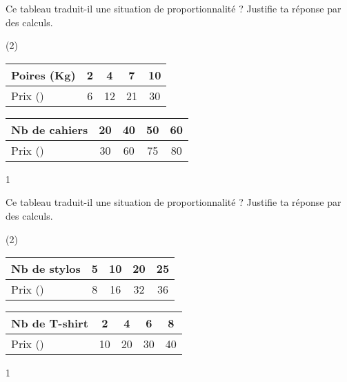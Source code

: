 \documentclass[a4paper,11pt]{report}
\begin{document}
\begin{exo}{
Ce tableau traduit-il une situation de proportionnalité ? Justifie ta réponse par des calculs.

\begin{tasks}(2)
\task 
\begin{tabular}{|l|c|c|c|c|}\hline
Poires (Kg) & 2& 4 &7 & 10 \\\hline
Prix (\tunit{}{\fr}) & 6& 12 &21 & 30 \\\hline
\end{tabular}
\task 
\begin{tabular}{|l|c|c|c|c|}\hline
Nb de cahiers & 20& 40& 50& 60  \\\hline
Prix (\tunit{}{\fr}) & 30 & 60 & 75 & 80 \\\hline
\end{tabular}
\end{tasks}
\medskip}{1}
\end{exo}

\begin{exo}{
Ce tableau traduit-il une situation de proportionnalité ? Justifie ta réponse par des calculs.

\begin{tasks}(2)
\task 
\begin{tabular}{|l|c|c|c|c|}\hline
Nb de stylos & 5 & 10 & 20 & 25  \\\hline
Prix (\tunit{}{\fr}) & 8 & 16  & 32 & 36  \\\hline
\end{tabular}
\task 
\begin{tabular}{|l|c|c|c|c|}\hline
Nb de T-shirt & 2 & 4& 6& 8 \\\hline
Prix (\tunit{}{\fr}) &10 & 20&30 & 40 \\\hline
\end{tabular}
\end{tasks}
\medskip}{1}
\end{exo}
\end{document}
